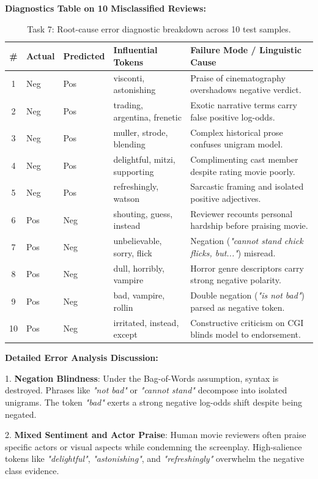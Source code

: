 \documentclass[12pt]{article}
\begin{document}
\textbf{Diagnostics Table on 10 Misclassified Reviews:}

\begin{table}[H]
\centering
\small
\begin{tabular}{@{}clllp{5.5cm}@{}}
\toprule
\textbf{\#} & \textbf{Actual} & \textbf{Predicted} & \textbf{Influential Tokens} & \textbf{Failure Mode / Linguistic Cause} \\ \midrule
1 & Neg & Pos & visconti, astonishing & Praise of cinematography overshadows negative verdict. \\
2 & Neg & Pos & trading, argentina, frenetic & Exotic narrative terms carry false positive log-odds. \\
3 & Neg & Pos & muller, strode, blending & Complex historical prose confuses unigram model. \\
4 & Neg & Pos & delightful, mitzi, supporting & Complimenting cast member despite rating movie poorly. \\
5 & Neg & Pos & refreshingly, watson & Sarcastic framing and isolated positive adjectives. \\ \midrule
6 & Pos & Neg & shouting, guess, instead & Reviewer recounts personal hardship before praising movie. \\
7 & Pos & Neg & unbelievable, sorry, flick & Negation (\textit{"cannot stand chick flicks, but..."}) misread. \\
8 & Pos & Neg & dull, horribly, vampire & Horror genre descriptors carry strong negative polarity. \\
9 & Pos & Neg & bad, vampire, rollin & Double negation (\textit{"is not bad"}) parsed as negative token. \\
10 & Pos & Neg & irritated, instead, except & Constructive criticism on CGI blinds model to endorsement. \\ \bottomrule
\end{tabular}
\caption{Task 7: Root-cause error diagnostic breakdown across 10 test samples.}
\end{table}

\textbf{Detailed Error Analysis Discussion:}

1. \textbf{Negation Blindness}: Under the Bag-of-Words assumption, syntax is destroyed. Phrases like \textit{"not bad"} or \textit{"cannot stand"} decompose into isolated unigrams. The token \textit{"bad"} exerts a strong negative log-odds shift despite being negated.

2. \textbf{Mixed Sentiment and Actor Praise}: Human movie reviewers often praise specific actors or visual aspects while condemning the screenplay. High-salience tokens like \textit{"delightful"}, \textit{"astonishing"}, and \textit{"refreshingly"} overwhelm the negative class evidence.
\end{document}
